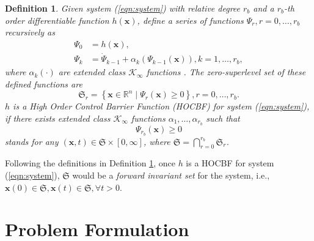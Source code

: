 \documentclass{ifacconf}
\newtheorem{definition}{Definition}
\begin{document}
\begin{definition}\label{def:HOCBF}
   Given system (\ref{eqn:system}) with relative degree $r_b$ and a $r_b$-th order differentiable function $h(\boldsymbol{x})$, define a series of functions $\Psi_r, r = 0, \dots, r_b$ recursively as
   \begin{equation} \label{eqn:cbfRecursive}
     \begin{aligned}
       \Psi_0 &= h(\boldsymbol{x}), \\
       \Psi_k &= \dot{\Psi}_{k-1} + \alpha_k\left( \Psi_{k-1}(\boldsymbol{x}) \right), k = 1,\dots,r_b,
     \end{aligned}
   \end{equation}
   where $\alpha_k(\cdot)$ are extended class $\mathcal{K}_{\infty}$ functions \footnotemark.
   The zero-superlevel set of these defined functions are
   \begin{equation}
     \mathfrak{S}_r = \left\{ \boldsymbol{x} \in \mathbb{R}^n \mid \Psi_r(\boldsymbol{x}) \ge 0 \right\}, r = 0,\dots,r_b.
   \end{equation}
   $h$ is a \textit{High Order Control Barrier Function (HOCBF)} for system (\ref{eqn:system}), if there exists extended class $\mathcal{K}_{\infty}$ functions $\alpha_1, \dots, \alpha_{r_b}$ such that
   \begin{equation} \label{eqn:cbfConstraint}
     \Psi_{r_b}(\boldsymbol{x}) \ge 0
   \end{equation}
   stands for any $(\boldsymbol{x},t) \in \mathfrak{S} \times [0,\infty]$, where $\mathfrak{S} = \bigcap_{r = 0}^{r_b} \mathfrak{S}_r$. 

\end{definition}

\begin{thm} \label{thm:HOCBF}
   \par Following the definitions in Definition \ref{def:HOCBF}, once $h$ is a HOCBF for system (\ref{eqn:system}), $\mathfrak{S}$ would be a \textit{forward invariant set} for the system, i.e., $\boldsymbol{x}(0) \in \mathfrak{S}, \boldsymbol{x}(t) \in \mathfrak{S}, \forall t > 0$.
\end{thm}

\section{Problem Formulation}\label{sec:problemFormulation}
\end{document}
